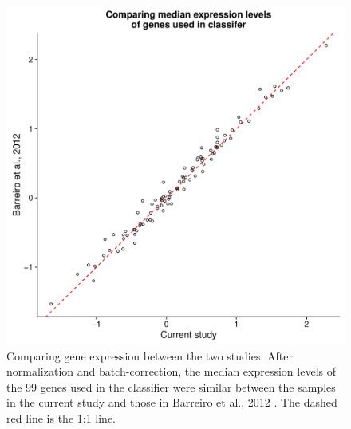 \documentclass[fleqn,10pt]{wlscirep}
\begin{document}
\begin{figure}[ht]
\centering
\includegraphics[width=\linewidth]{../figure/classifier-exp.pdf}
\caption{
Comparing gene expression between the two studies. After normalization
and batch-correction, the median expression levels of the 99 genes
used in the classifier were similar between the samples in the current
study and those in Barreiro et al., 2012 \cite{Barreiro2012}. The
dashed red line is the 1:1 line.
}
\label{fig:class-exp}
\end{figure}
\end{document}
